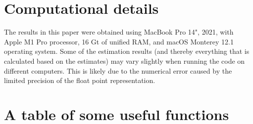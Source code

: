 \documentclass[nojss]{jss}
\begin{document}
\section*{Computational details}

The results in this paper were obtained using MacBook Pro 14", 2021, with Apple M1 Pro processor, 16 Gt of unified RAM, and macOS Monterey 12.1 operating system. Some of the estimation results (and thereby everything that is calculated based on the estimates) may vary slightly when running the code on different computers. This is likely due to the numerical error caused by the limited precision of the float point representation.


\cleardoublepage
\section*{A table of some useful functions}\label{sec:table}
\end{document}
